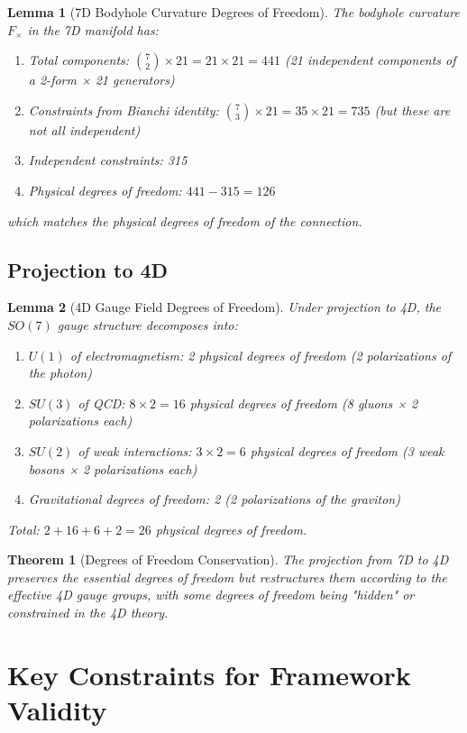 \documentclass{article}
\newtheorem{theorem}{Theorem}
\newtheorem{lemma}{Lemma}
\begin{document}
\begin{lemma}[7D Bodyhole Curvature Degrees of Freedom]
The bodyhole curvature $F_{\times}$ in the 7D manifold has:
\begin{enumerate}
\item Total components: $\binom{7}{2} \times 21 = 21 \times 21 = 441$ (21 independent components of a 2-form × 21 generators)
\item Constraints from Bianchi identity: $\binom{7}{3} \times 21 = 35 \times 21 = 735$ (but these are not all independent)
\item Independent constraints: 315
\item Physical degrees of freedom: $441 - 315 = 126$
\end{enumerate}
which matches the physical degrees of freedom of the connection.
\end{lemma}

\subsection{Projection to 4D}

\begin{lemma}[4D Gauge Field Degrees of Freedom]
Under projection to 4D, the $SO(7)$ gauge structure decomposes into:
\begin{enumerate}
\item $U(1)$ of electromagnetism: 2 physical degrees of freedom (2 polarizations of the photon)
\item $SU(3)$ of QCD: $8 \times 2 = 16$ physical degrees of freedom (8 gluons × 2 polarizations each)
\item $SU(2)$ of weak interactions: $3 \times 2 = 6$ physical degrees of freedom (3 weak bosons × 2 polarizations each)
\item Gravitational degrees of freedom: 2 (2 polarizations of the graviton)
\end{enumerate}
Total: $2 + 16 + 6 + 2 = 26$ physical degrees of freedom.
\end{lemma}

\begin{theorem}[Degrees of Freedom Conservation]
The projection from 7D to 4D preserves the essential degrees of freedom but restructures them according to the effective 4D gauge groups, with some degrees of freedom being "hidden" or constrained in the 4D theory.
\end{theorem}

\section{Key Constraints for Framework Validity}
\end{document}
